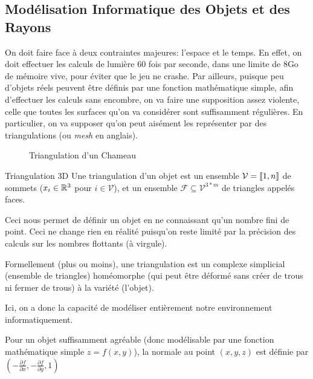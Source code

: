 \documentclass{classe}
\begin{document}
\subsection{Modélisation Informatique des Objets et des Rayons}
On doit faire face à deux contraintes majeures: l'espace et le temps.
En effet, on doit effectuer les calculs de lumière 60 fois par seconde, dans une limite de 8Go de mémoire vive, pour éviter que le jeu ne crashe.
Par ailleurs, puisque peu d'objets réels peuvent être définis par une fonction mathématique simple, afin d'effectuer les calculs sans encombre, on va faire une supposition assez violente, celle que toutes les surfaces qu'on va considérer sont suffisamment régulières.
En particulier, on va supposer qu'on peut aisément les représenter par des triangulations (ou \emph{mesh} en anglais).

\begin{figure}[h]
	\centering
	\caption{Triangulation d'un Chameau}
	\label{fig:camel}
\end{figure}

\begin{définition}{Triangulation 3D}{}
	Une triangulation d'un objet est un ensemble $\mathcal{V} = \left\llbracket 1, n\right\rrbracket$ de sommets ($x_{i} \in \mathbb{R}^{3}$ pour $i \in \mathcal{V}$), et un ensemble $\mathcal{F} \subseteq \mathcal{V}^{3 * m}$ de triangles appelés faces.
\end{définition}

Ceci nous permet de définir un objet en ne connaissant qu'un nombre fini de point.
Ceci ne change rien en réalité puisqu'on reste limité par la précision des calculs sur les nombres flottants (à virgule).

\begin{remarque}{}{}
	Formellement (plus ou moins), une triangulation est un complexe simplicial (ensemble de triangles) homéomorphe (qui peut être déformé sans créer de trous ni fermer de trous) à la variété (l'objet).
\end{remarque}

Ici, on a donc la capacité de modéliser entièrement notre environnement informatiquement.

\begin{remarque}{}{}
	Pour un objet suffisamment agréable (donc modélisable par une fonction mathématique simple $z = f(x, y)$), la normale au point $(x, y, z)$ est définie par $(-\frac{\partial{f}}{\partial{x}}, -\frac{\partial{f}}{\partial{y}}, 1)$
\end{remarque}
\end{document}
